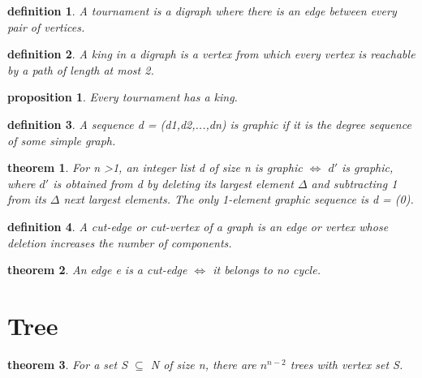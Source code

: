 \documentclass[twocolumn]{article}
\newtheorem{theorem}{theorem}[section]  %
\newtheorem{definition}{definition}
\newtheorem{proposition}{proposition}
\begin{document}
\begin{CJK*}{UTF8}{bkai}
    \begin{definition}
        A tournament is a digraph where there is an edge between every pair of
 vertices.
    \end{definition}

    \begin{definition}
         A king in a digraph is a vertex from which every vertex is reachable by a path
 of length at most 2.
    \end{definition}

    \begin{proposition}
        Every tournament has a king.
    \end{proposition}

    \begin{definition}
         A sequence d = (d1,d2,...,dn) is graphic if it is the degree sequence of some
 simple graph.
    \end{definition}

    \begin{theorem}
         For n >1, an integer list d of size n is graphic $\iff$ $d\prime$ is graphic, where $d\prime$ is
 obtained from d by deleting its largest element $\Delta$ and subtracting 1 from its $\Delta$
 next largest elements. The only 1-element graphic sequence is d = (0).
    \end{theorem}

    \begin{definition}
         A cut-edge or cut-vertex of a graph is an edge or vertex whose deletion
 increases the number of components.
    \end{definition}

    \begin{theorem}
        An edge e is a cut-edge $\iff$ it belongs to no cycle.
    \end{theorem}

    
    


\section{Tree}

    \begin{theorem}
         For a set S $\subseteq$ N of size n, there are $n^{n-2}$ trees with vertex set S.
    \end{theorem}


\end{CJK*}
\end{document}
